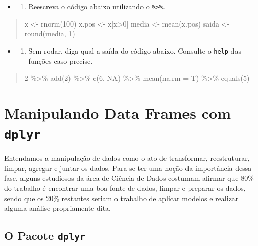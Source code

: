 \documentclass[]{book}
\providecommand{\tightlist}{%
  \setlength{\itemsep}{0pt}\setlength{\parskip}{0pt}}
\begin{document}
\begin{itemize}
\item
  \begin{enumerate}
  \def\labelenumi{\arabic{enumi}.}
  \setcounter{enumi}{1}
  \tightlist
  \item
    Reescreva o código abaixo utilizando o \texttt{\%\textgreater{}\%}.
  \end{enumerate}
\end{itemize}

\begin{quote}
x \textless{}- rnorm(100)
x.pos \textless{}- x{[}x\textgreater{}0{]}
media \textless{}- mean(x.pos)
saida \textless{}- round(media, 1)
\end{quote}

\begin{itemize}
\item
  \begin{enumerate}
  \def\labelenumi{\arabic{enumi}.}
  \setcounter{enumi}{2}
  \tightlist
  \item
    Sem rodar, diga qual a saída do código abaixo. Consulte o \texttt{help} das funções caso precise.
  \end{enumerate}
\end{itemize}

\begin{quote}
2 \%\textgreater{}\%
add(2) \%\textgreater{}\%
c(6, NA) \%\textgreater{}\%
mean(na.rm = T) \%\textgreater{}\%
equals(5)
\end{quote}

\hypertarget{method}{%
\chapter{\texorpdfstring{Manipulando Data Frames com \texttt{dplyr}}{Manipulando Data Frames com dplyr}}\label{method}}

Entendamos a manipulação de dados como o ato de transformar, reestruturar, limpar, agregar e juntar os dados. Para se ter uma noção da importância dessa fase, alguns estudiosos da área de Ciência de Dados costumam afirmar que 80\% do trabalho é encontrar uma boa fonte de dados, limpar e preparar os dados, sendo que os 20\% restantes seriam o trabalho de aplicar modelos e realizar alguma análise propriamente dita.

\hypertarget{o-pacote-dplyr}{%
\section{\texorpdfstring{O Pacote \texttt{dplyr}}{O Pacote dplyr}}\label{o-pacote-dplyr}}
\end{document}
